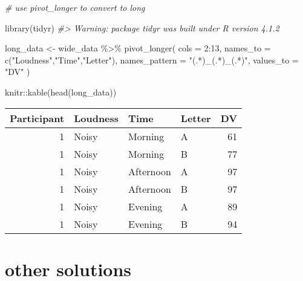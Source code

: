 \documentclass[
]{book}
\newenvironment{Shaded}{\begin{snugshade}}{\end{snugshade}}
\newcommand{\AttributeTok}[1]{\textcolor[rgb]{0.77,0.63,0.00}{#1}}
\newcommand{\CommentTok}[1]{\textcolor[rgb]{0.56,0.35,0.01}{\textit{#1}}}
\newcommand{\DecValTok}[1]{\textcolor[rgb]{0.00,0.00,0.81}{#1}}
\newcommand{\FunctionTok}[1]{\textcolor[rgb]{0.00,0.00,0.00}{#1}}
\newcommand{\NormalTok}[1]{#1}
\newcommand{\OtherTok}[1]{\textcolor[rgb]{0.56,0.35,0.01}{#1}}
\newcommand{\SpecialCharTok}[1]{\textcolor[rgb]{0.00,0.00,0.00}{#1}}
\newcommand{\StringTok}[1]{\textcolor[rgb]{0.31,0.60,0.02}{#1}}
\theoremstyle{definition}
\theoremstyle{definition}
\theoremstyle{definition}
\theoremstyle{definition}
\theoremstyle{remark}
\begin{document}
\begin{Shaded}
\begin{Highlighting}[]
\CommentTok{\# use pivot\_longer to convert to long}

\FunctionTok{library}\NormalTok{(tidyr)}
\CommentTok{\#\textgreater{} Warning: package \textquotesingle{}tidyr\textquotesingle{} was built under R version 4.1.2}

\NormalTok{long\_data }\OtherTok{\textless{}{-}}\NormalTok{ wide\_data }\SpecialCharTok{\%\textgreater{}\%} \FunctionTok{pivot\_longer}\NormalTok{(}
  \AttributeTok{cols =} \DecValTok{2}\SpecialCharTok{:}\DecValTok{13}\NormalTok{,}
  \AttributeTok{names\_to =} \FunctionTok{c}\NormalTok{(}\StringTok{"Loudness"}\NormalTok{,}\StringTok{"Time"}\NormalTok{,}\StringTok{"Letter"}\NormalTok{),}
  \AttributeTok{names\_pattern =} \StringTok{"(.*)\_(.*)\_(.*)"}\NormalTok{,}
  \AttributeTok{values\_to =} \StringTok{"DV"}
\NormalTok{)}

\NormalTok{knitr}\SpecialCharTok{::}\FunctionTok{kable}\NormalTok{(}\FunctionTok{head}\NormalTok{(long\_data))}
\end{Highlighting}
\end{Shaded}

\begin{tabular}{r|l|l|l|r}
\hline
Participant & Loudness & Time & Letter & DV\\
\hline
1 & Noisy & Morning & A & 61\\
\hline
1 & Noisy & Morning & B & 77\\
\hline
1 & Noisy & Afternoon & A & 97\\
\hline
1 & Noisy & Afternoon & B & 97\\
\hline
1 & Noisy & Evening & A & 89\\
\hline
1 & Noisy & Evening & B & 94\\
\hline
\end{tabular}

\hypertarget{other-solutions}{%
\section{other solutions}\label{other-solutions}}
\end{document}
